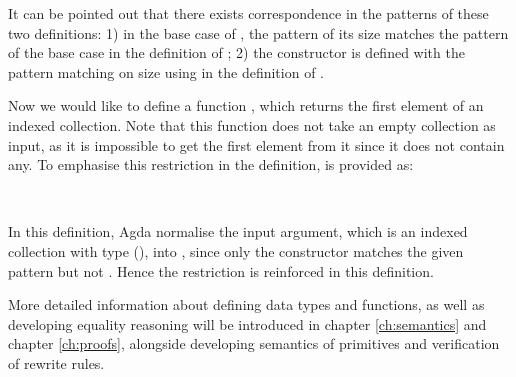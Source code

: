 \documentclass{l4proj}
\begin{document}
It can be pointed out that there exists correspondence in the patterns of these two definitions: 1) in the base case of , the pattern of its size matches the pattern of the base case  in the definition of ; 2) the constructor  is defined with the pattern matching on size using  in the definition of .

Now we would like to define a function , which returns the first element of an indexed collection. Note that this function does not take an empty collection as input, as it is impossible to get the first element from it since it does not contain any. To emphasise this restriction in the definition,  is provided as:
\begin{code}%
\>[0]\AgdaSpace{}%
\AgdaSymbol{:}\AgdaSpace{}%
\AgdaSymbol{\{}\AgdaSpace{}%
\AgdaSymbol{:}\AgdaSpace{}%
\AgdaSymbol{\}}\AgdaSpace{}%
\AgdaSpace{}%
\AgdaSymbol{\{}\AgdaSpace{}%
\AgdaSymbol{:}\AgdaSpace{}%
\AgdaSymbol{\}}\AgdaSpace{}%
\AgdaSpace{}%
\AgdaSpace{}%
\AgdaSpace{}%
\AgdaSymbol{(}\AgdaSpace{}%
\AgdaSymbol{)}\AgdaSpace{}%
\AgdaSpace{}%
\<%
\\
\>[0]\AgdaSpace{}%
\AgdaSymbol{(}\AgdaSpace{}%
\AgdaSpace{}%
\AgdaSymbol{)}\AgdaSpace{}%
\AgdaSymbol{=}\AgdaSpace{}%
\<%
\end{code}

In this definition, Agda normalise the input argument, which is an indexed collection with type (\AgdaSpace{}\AgdaSpace{}\AgdaSymbol{(}\AgdaSpace{}\AgdaSymbol{)}), into \AgdaSymbol{(}\AgdaSpace{}\AgdaSpace{}\AgdaSymbol{)}, since only the constructor  matches the given pattern but not \AgdaInductiveConstructor{[]}. Hence the restriction is reinforced in this definition. 

More detailed information about defining data types and functions, as well as developing equality reasoning will be introduced in chapter \ref{ch:semantics} and chapter \ref{ch:proofs}, alongside developing semantics of primitives and verification of rewrite rules.
\end{document}
